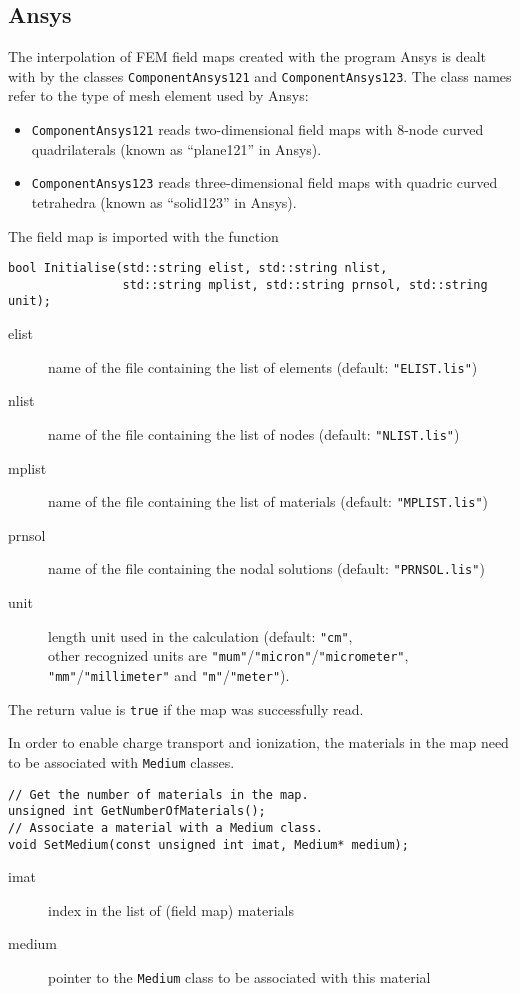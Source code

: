 \subsection{Ansys}

The interpolation of FEM field maps 
created with the program Ansys \cite{ANSYS} 
is dealt with by the classes
\texttt{ComponentAnsys121} and \texttt{ComponentAnsys123}. 
The class names refer to the type of mesh element used by Ansys:
  \begin{itemize}
  \item
  \texttt{ComponentAnsys121} reads two-dimensional field maps 
with 8-node curved quadrilaterals (known as ``plane121'' in Ansys). 
  \item
  \texttt{ComponentAnsys123} reads three-dimensional field maps 
with quadric curved tetrahedra (known as ``solid123'' in Ansys).
  \end{itemize}
The field map is imported with the function
\begin{lstlisting}
bool Initialise(std::string elist, std::string nlist,
                std::string mplist, std::string prnsol, std::string unit);
\end{lstlisting}
\begin{description}
  \item[elist]
  name of the file containing the list of elements 
  (default: \texttt{"ELIST.lis"})
  \item[nlist]
  name of the file containing the list of nodes
  (default: \texttt{"NLIST.lis"})
  \item[mplist]
  name of the file containing the list of materials
  (default: \texttt{"MPLIST.lis"})
  \item[prnsol]
  name of the file containing the nodal solutions
  (default: \texttt{"PRNSOL.lis"})
  \item[unit]
  length unit used in the calculation (default: \texttt{"cm"}, \\ 
  other recognized units are 
  \texttt{"mum"}/\texttt{"micron"}/\texttt{"micrometer"},
  \texttt{"mm"}/\texttt{"millimeter"} and 
  \texttt{"m"}/\texttt{"meter"}).
\end{description}
The return value is \texttt{true} if the map was successfully read. 

In order to enable charge transport and ionization,
the materials in the map need to be associated with \texttt{Medium} classes.
\begin{lstlisting}
// Get the number of materials in the map.
unsigned int GetNumberOfMaterials();
// Associate a material with a Medium class.
void SetMedium(const unsigned int imat, Medium* medium);
\end{lstlisting}
\begin{description}
\item[imat]
index in the list of (field map) materials
\item[medium]
pointer to the \texttt{Medium} class to be associated with this material
\end{description}

